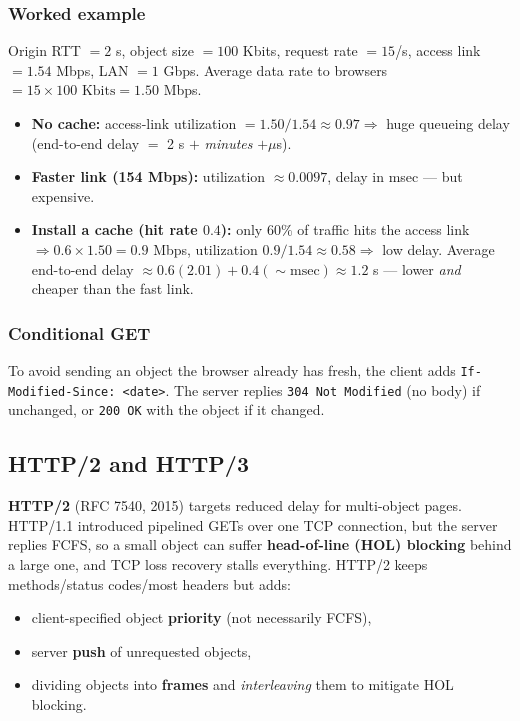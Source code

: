 \documentclass[hidelinks]{article}
\begin{document}
\subsubsection{Worked example}
Origin RTT $=2$ s, object size $=100$ Kbits, request rate $=15$/s, access
link $=1.54$ Mbps, LAN $=1$ Gbps. Average data rate to browsers
$=15 \times 100\text{ Kbits} = 1.50$ Mbps.
\begin{itemize}
    \item \textbf{No cache:} access-link utilization
    $=1.50/1.54 \approx 0.97 \Rightarrow$ huge queueing delay
    (end-to-end delay $=$ 2 s $+$ \emph{minutes} $+ \mu$s).
    \item \textbf{Faster link (154 Mbps):} utilization $\approx 0.0097$,
    delay in msec --- but expensive.
    \item \textbf{Install a cache (hit rate $0.4$):} only $60\%$ of traffic
    hits the access link $\Rightarrow 0.6 \times 1.50 = 0.9$ Mbps,
    utilization $0.9/1.54 \approx 0.58 \Rightarrow$ low delay. Average
    end-to-end delay $\approx 0.6(2.01) + 0.4(\sim\!\text{msec})
    \approx 1.2$ s --- lower \emph{and} cheaper than the fast link.
\end{itemize}

\subsubsection{Conditional GET}
To avoid sending an object the browser already has fresh, the client adds
\texttt{If-Modified-Since: <date>}. The server replies
\texttt{304 Not Modified} (no body) if unchanged, or \texttt{200 OK} with the
object if it changed.

\subsection{HTTP/2 and HTTP/3}

\textbf{HTTP/2} (RFC 7540, 2015) targets reduced delay for multi-object
pages. HTTP/1.1 introduced pipelined GETs over one TCP connection, but the
server replies FCFS, so a small object can suffer \textbf{head-of-line (HOL)
blocking} behind a large one, and TCP loss recovery stalls everything.
HTTP/2 keeps methods/status codes/most headers but adds:
\begin{itemize}
    \item client-specified object \textbf{priority} (not necessarily FCFS),
    \item server \textbf{push} of unrequested objects,
    \item dividing objects into \textbf{frames} and \emph{interleaving} them
    to mitigate HOL blocking.
\end{itemize}
\end{document}
